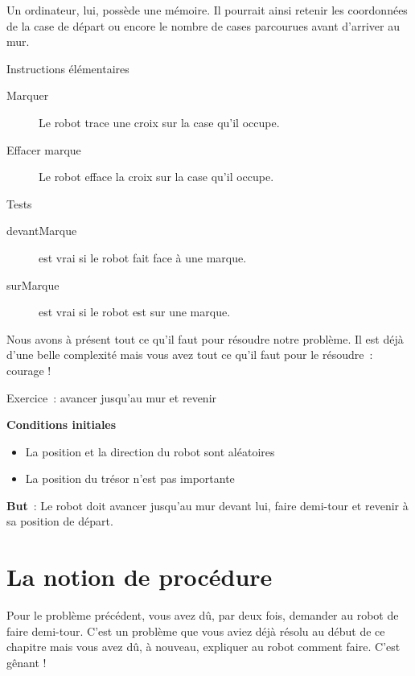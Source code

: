 	Un ordinateur, lui, possède une mémoire. Il pourrait ainsi retenir les
	coordonnées de la case de départ ou encore le nombre de cases
	parcourues avant d'arriver au mur.

	
	\begin{Emphase}[definition]{Instructions élémentaires}
		\remonter
		\begin{description}
		\item[Marquer]
			Le robot trace une croix sur la case qu'il occupe.
		\item[Effacer marque]
			Le robot efface la croix sur la case qu'il occupe.
		\end{description}
	\end{Emphase}

	\begin{Emphase}{Tests}
		\remonter
		\begin{description}
		\item[devantMarque]
			est vrai si le robot fait face à une marque.
		\item[surMarque]
			est vrai si le robot est sur une marque.
		\end{description}
	\end{Emphase}

	Nous avons à présent tout ce qu'il faut pour résoudre
	notre problème. Il est déjà d'une belle complexité
	mais vous avez tout ce qu'il faut pour le résoudre~:
	courage !

	
	\begin{Emphase}[exercice]{Exercice~: avancer jusqu'au mur et revenir}

		\textbf{Conditions initiales}

		\begin{itemize}
		\item La position et la direction du robot sont aléatoires
		\item La position du trésor n'est pas importante
		\end{itemize}
		
		\textbf{But}~: Le robot doit avancer jusqu'au mur
		devant lui, faire demi-tour et revenir à sa position de départ.

	\end{Emphase}

\section{La notion de procédure}

	Pour le problème précédent, vous avez dû, par deux fois, demander au
	robot de faire demi-tour. C'est un problème que vous
	aviez déjà résolu au début de ce chapitre mais vous avez dû, à nouveau,
	expliquer au robot comment faire. C'est gênant !

